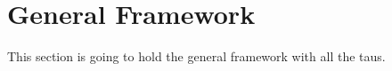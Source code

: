 \section{General Framework} \label{sec:genform}

This section is going to hold the general framework with all the taus.
